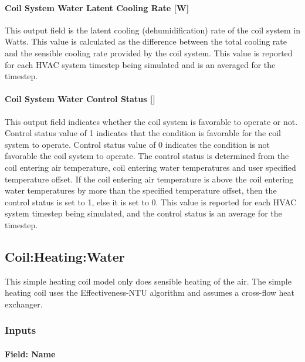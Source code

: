 \paragraph{Coil System Water Latent Cooling Rate {[}W{]}}\label{coil-system-water-latent-cooling-rate}

This output field is the latent cooling (dehumidification) rate of the coil system in Watts. This value is calculated as the difference between the total cooling rate and the sensible cooling rate provided by the coil system. This value is reported for each HVAC system timestep being simulated and is an averaged for the timestep.

\paragraph{Coil System Water Control Status {[]}}\label{coil-system-water-control-status}

This output field indicates whether the coil system is favorable to operate or not. Control status value of 1 indicates that the condition is favorable for the coil system to operate. Control status value of 0 indicates the condition is not favorable the coil system to operate. The control status is determined from the coil entering air temperature, coil entering water temperatures and user specified temperature offset. If the coil entering air temperature is above the coil entering water temperatures by more than the specified temperature offset, then the control status is set to 1, else it is set to 0. This value is reported for each HVAC system timestep being simulated, and the control status is an average for the timestep.


\subsection{Coil:Heating:Water}\label{coilheatingwater}

This simple heating coil model only does sensible heating of the air. The simple heating coil uses the Effectiveness-NTU algorithm and assumes a cross-flow heat exchanger.

\subsubsection{Inputs}\label{inputs-1-020}

\paragraph{Field: Name}\label{field-name-1-019}

